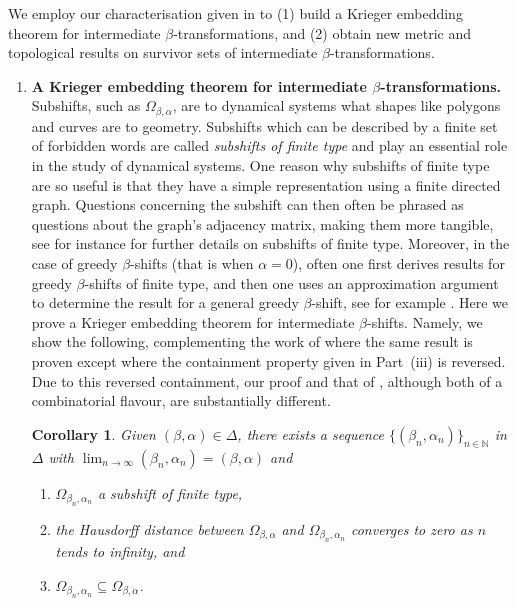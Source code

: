 \documentclass[a4paper,reqno,10pt]{amsart}
\newtheorem{corollary}[theorem]{Corollary}
\begin{document}
We employ our characterisation given in  to (1) build a Krieger embedding theorem for intermediate \mbox{$\beta$-transformations}, and (2) obtain new metric and topological results on survivor sets of intermediate \mbox{$\beta$-transformations}.
%
    \begin{enumerate}[label={\rm(\arabic*)},leftmargin=*]
        \item {\bfseries A Krieger embedding theorem for intermediate \mbox{$\beta$-transformations.}} Subshifts, such as $\Omega_{\beta, \alpha}$, are to dynamical systems what shapes like polygons and curves are to geometry. Subshifts which can be described by a finite set of forbidden words are called \textsl{subshifts of finite type} and play an essential role in the study of dynamical systems. One reason why subshifts of finite type are so useful is that they have a simple representation using a finite directed graph. Questions concerning the subshift can then often be phrased as questions about the graph’s adjacency matrix, making them more tangible, see for instance \cite{LM,brin_stuck_2002} for further details on subshifts of finite type. Moreover, in the case of greedy $\beta$-shifts (that is when $\alpha = 0$), often one first derives results for greedy $\beta$-shifts of finite type, and then one uses an approximation argument to determine the result for a general greedy $\beta$-shift, see for example \cite{DavidFarm2010,LL16}.  Here we prove a Krieger embedding theorem for intermediate $\beta$-shifts.  Namely, we show the following, complementing the work of \cite{LSSS} where the same result is proven except where the containment property given in Part~(iii) is reversed.  Due to this reversed containment, our proof and that of \cite{LSSS}, although both of a combinatorial flavour, are substantially different.
            \begin{corollary}\label{Cor_1}
                Given $(\beta, \alpha) \in \Delta$, there exists a sequence $\{ (\beta_{n}, \alpha_{n}) \}_{n \in \mathbb{N}}$ in $\Delta$ with $\lim_{n\to \infty} (\beta_{n}, \alpha_{n}) = (\beta, \alpha)$ and
                    \begin{enumerate}[label={\rm(\roman*)}]
                        \item $\Omega_{\beta_{n}, \alpha_{n}}$ a subshift of finite type,
                        \item the Hausdorff distance between $\Omega_{\beta, \alpha}$ and $\Omega_{\beta_{n}, \alpha_{n}}$ converges to zero as $n$ tends to infinity, and 
                        \item $\Omega_{\beta_{n}, \alpha_{n}} \subseteq \Omega_{\beta, \alpha}$.

\end{enumerate}
\end{corollary}
\end{enumerate}
\end{document}

